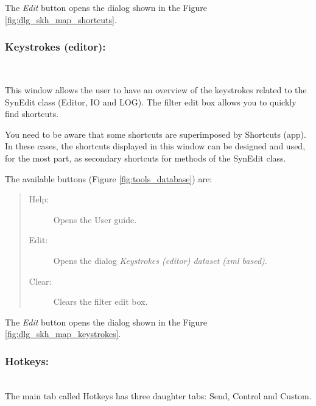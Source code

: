 The \textit{Edit} button opens the dialog shown in the Figure \ref{fig:dlg_skh_map_shortcuts}.

\subsubsection{Keystrokes (editor):}\\

This window allows the user to have an overview of the keystrokes related to the SynEdit class
(Editor, IO and LOG). The filter edit box allows you to quickly find shortcuts.

You need to be aware that some shortcuts are superimposed by Shortcuts (app). In these cases,
the shortcuts displayed in this window can be designed and used, for the most part,
as secondary shortcuts for methods of the SynEdit class.

The available buttons
(Figure \ref{fig:tools_database})
are:

\begin{quote}
  \begin{footnotesize}
    \begin{description}
      \item[Help:]
        Opens the User guide.
      \item[Edit:]
        Opens the dialog \textit{Keystrokes (editor) dataset (xml based)}.
      \item [Clear:]
        Clears the filter edit box.
    \end{description}
  \end{footnotesize}
\end{quote}

The \textit{Edit} button opens the dialog shown in the Figure \ref{fig:dlg_skh_map_keystrokes}.


\subsubsection{Hotkeys:}\\
The main tab called Hotkeys has three daughter tabs: Send, Control and Custom.


